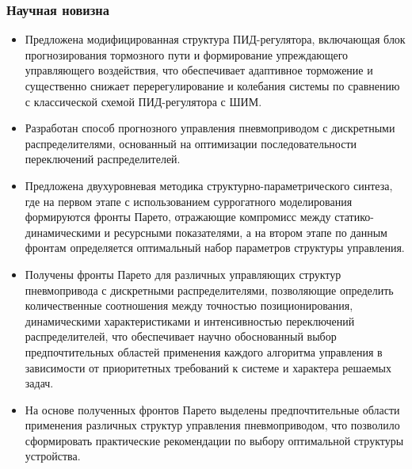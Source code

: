 \begin{frame}
	\frametitle{Научная новизна}
	\begin{itemize}

		\item \scriptsize Предложена модифицированная структура ПИД-регулятора, включающая блок прогнозирования тормозного пути и
		      формирование упреждающего управляющего воздействия, что обеспечивает адаптивное торможение и существенно снижает
		      перерегулирование и колебания системы по сравнению с классической схемой ПИД-регулятора с ШИМ.

		\item \scriptsize Разработан способ прогнозного управления пневмоприводом с дискретными распределителями,
		      основанный на оптимизации последовательности переключений распределителей.

		\item \scriptsize Предложена двухуровневая методика структурно-параметрического синтеза, где
		      на первом этапе с использованием суррогатного моделирования формируются фронты Парето,
		      отражающие компромисс между статико-динамическими и ресурсными показателями, а на
		      втором этапе по данным фронтам определяется оптимальный набор параметров структуры управления.

		\item \scriptsize Получены фронты Парето для различных управляющих структур пневмопривода с дискретными распределителями,
		      позволяющие определить количественные соотношения между точностью позиционирования, динамическими
		      характеристиками и интенсивностью переключений распределителей, что обеспечивает научно обоснованный
		      выбор предпочтительных областей применения каждого алгоритма управления в зависимости
		      от приоритетных требований к системе и характера решаемых задач.

		\item \scriptsize На основе полученных фронтов Парето выделены предпочтительные области применения различных
		      структур управления пневмоприводом, что позволило сформировать практические рекомендации по выбору
		      оптимальной структуры устройства.
	\end{itemize}
\end{frame}


